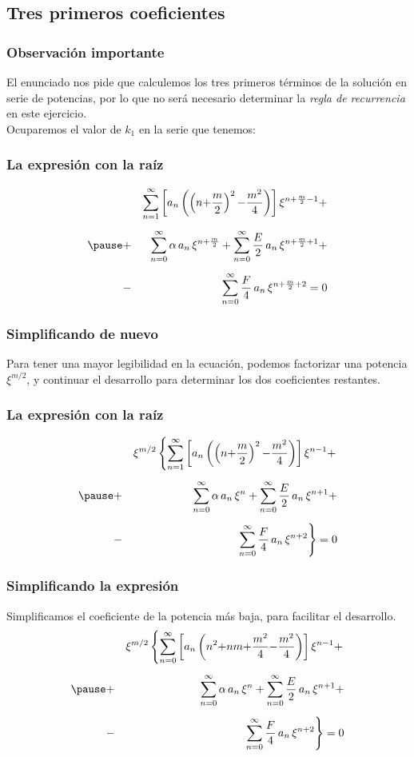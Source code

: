 \subsection{Tres primeros coeficientes}
\begin{frame}
\frametitle{Observación importante}
El enunciado nos pide que calculemos los tres primeros términos de la solución en serie de potencias, por lo que no será necesario determinar la \emph{regla de recurrencia} en este ejercicio.
\\
\bigskip
Ocuparemos el valor de $k_{1}$ en la serie que tenemos:
\end{frame}
\begin{frame}
\frametitle{La expresión con la raíz}
\vspace{-1cm}
\begin{eqnarray*}
&{}& \sum_{n=1}^{\infty} \left[ a_{n} \left( \left(n {+} \dfrac{m}{2} \right)^{2} {-} \dfrac{m^{2}}{4} \right) \right] \xi^{n+\frac{m}{2}-1} + \\[0.5em] \pause
&+& \sum_{n=0}^{\infty} \alpha \, a_{n} \, \xi^{n+\frac{m}{2}} + \sum_{n=0}^{\infty} \dfrac{E}{2} \, a_{n} \, \xi^{n+\frac{m}{2}+1} + \\[0.5em] 
&-& \sum_{n=0}^{\infty} \dfrac{F}{4} \, a_{n} \, \xi^{n+\frac{m}{2}+2} = 0
\end{eqnarray*}
\end{frame}
\begin{frame}
\frametitle{Simplificando de nuevo}
Para tener una mayor legibilidad en la ecuación, podemos factorizar una potencia $\xi^{m/2}$, y continuar el desarrollo para determinar los dos coeficientes restantes.
\end{frame}
\begin{frame}
\frametitle{La expresión con la raíz}
\vspace{-1cm}
\begin{eqnarray*}
&{}& \xi^{m/2} \left\{  \sum_{n=1}^{\infty} \left[ a_{n} \left( \left(n {+} \dfrac{m}{2} \right)^{2} {-} \dfrac{m^{2}}{4} \right) \right] \xi^{n-1} +  \right. \\[0.5em] \pause
&+& \sum_{n=0}^{\infty} \alpha \, a_{n} \, \xi^{n} + \sum_{n=0}^{\infty} \dfrac{E}{2} \, a_{n} \, \xi^{n+1} + \\[0.5em] 
&-& \left. \sum_{n=0}^{\infty} \dfrac{F}{4} \, a_{n} \, \xi^{n+2} \right\} = 0
\end{eqnarray*}
\end{frame}
\begin{frame}
\frametitle{Simplificando la expresión}
Simplificamos el coeficiente de la potencia más baja, para facilitar el desarrollo.
\begin{eqnarray*}
&{}& \xi^{m/2} \left\{  \sum_{n=0}^{\infty} \left[ a_{n} \left( n^{2} {+} n m {+} \dfrac{m^{2}}{4} {-} \dfrac{m^{2}}{4} \right) \right] \xi^{n-1} +  \right. \\[0.5em] \pause
&+& \sum_{n=0}^{\infty} \alpha \, a_{n} \, \xi^{n} + \sum_{n=0}^{\infty} \dfrac{E}{2} \, a_{n} \, \xi^{n+1} + \\[0.5em] 
&-& \left. \sum_{n=0}^{\infty} \dfrac{F}{4} \, a_{n} \, \xi^{n+2} \right\} = 0
\end{eqnarray*}
\end{frame}
